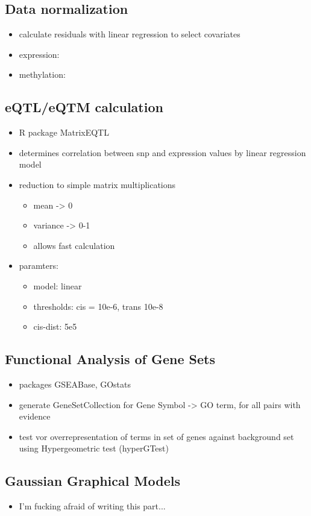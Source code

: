 \documentclass[a4paper,12pt]{article}
\begin{document}
\subsection{Data normalization}
\begin{itemize}
\item calculate residuals with linear regression to select covariates
\item expression: 
\item methylation:
\end{itemize}
\subsection{eQTL/eQTM calculation}
\begin{itemize}
\item R package MatrixEQTL
\item determines correlation between snp and expression values by linear regression model
\item reduction to simple matrix multiplications
\begin{itemize}
\item mean -> 0
\item variance -> 0-1
\item allows fast calculation
\end{itemize}
\item paramters: 
\begin{itemize}
\item model: linear
\item thresholds: cis = 10e-6, trans 10e-8
\item cis-dist: 5e5
\end{itemize}
\end{itemize}
\subsection{Functional Analysis of Gene Sets}
\begin{itemize}
\item packages GSEABase, GOstats
\item generate GeneSetCollection for Gene Symbol -> GO term, for all pairs with evidence
\item test vor overrepresentation of terms in set of genes against background set using Hypergeometric test (hyperGTest)
\end{itemize}
\subsection{Gaussian Graphical Models}
\begin{itemize}
\item I'm fucking afraid of writing this part...
\end{itemize}
\end{document}
